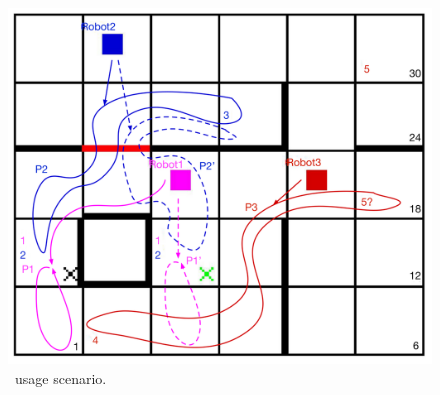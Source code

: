\begin{figure}[t]
\begin{center}
\includegraphics[width=1\linewidth]{Figures/arrows-v3.pdf}
\caption{\toolName\ usage scenario. }
\label{fig:outputexample}
\vspace{-.5cm}
\end{center}
\end{figure}





